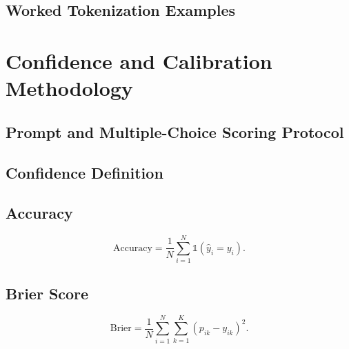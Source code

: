 \documentclass[runningheads]{llncs}
\begin{document}
\subsection{Worked Tokenization Examples}


\section{Confidence and Calibration Methodology}
\subsection{Prompt and Multiple-Choice Scoring Protocol}

\subsection{Confidence Definition}

\subsection{Accuracy}
\begin{equation}
	\mathrm{Accuracy} = \frac{1}{N}\sum_{i=1}^{N}
	\mathbb{1}(\hat{y}_i=y_i).
	\label{eq:accuracy}
\end{equation}

\subsection{Brier Score}
\begin{equation}
	\mathrm{Brier} =
	\frac{1}{N}\sum_{i=1}^{N}\sum_{k=1}^{K}
	(p_{ik}-y_{ik})^2.
	\label{eq:brier}
\end{equation}
\end{document}
